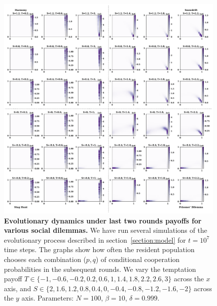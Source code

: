 \documentclass[11pt]{article}
\theoremstyle{plainCl1}
\theoremstyle{plainCl2}
\begin{document}
\begin{figure}[!htbp]
  \centering
  \includegraphics[width=\textwidth]{static/rounds_two_by_two_games.pdf}
  \caption{{\bf Evolutionary dynamics under last two rounds payoffs for various social dilemmas.} 
  We have run several simulations of the evolutionary process described in
  section~\ref{section:model} for $t\!=\!10^7$ time steps. The graphs show how
  often the resident population chooses each combination ($p,q$) of conditional
  cooperation probabilities in the subsequent rounds. We vary the temptation
  payoff \(T \in \{-1, -0.6, -0.2,  0.2, 0.6, 1, 1.4, 1.8, 2.2, 2.6, 3\}\)
  across the \(x\) axis, and  \(S \in \{2, 1.6, 1.2, 0.8, 0.4, 0, -0.4, -0.8,
  -1.2, -1.6, -2\}\) across the \(y\) axis. Parameters: $N\!=\!100$,
  $\beta\!=\!10$, $\delta\!=\!0.999$.}
  \label{fig:last_two_rounds_two_by_two}
\end{figure}
\end{document}
